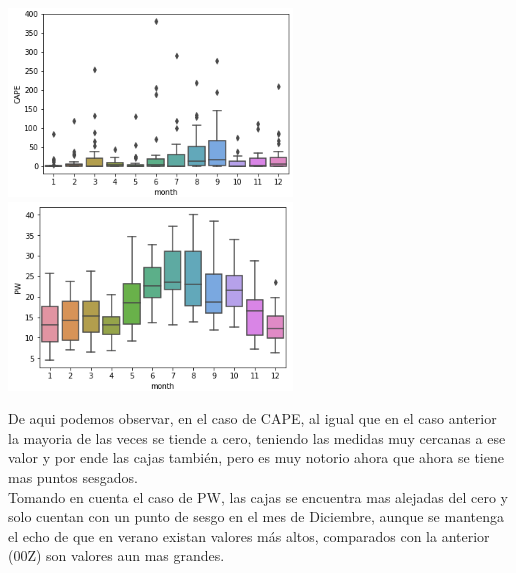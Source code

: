 \documentclass[12pt]{article}
\begin{document}
\begin{center}
	\includegraphics[height=5cm]{02.png} \hspace*{\fill}
    \includegraphics[height=5cm]{022.png}
\end{center}
De aqui podemos observar, en el caso de CAPE, al igual que en el caso anterior la mayoria de las veces se tiende a cero, teniendo las medidas muy cercanas a ese valor y por ende las cajas también, pero es muy notorio ahora que ahora se tiene mas puntos sesgados.\\

Tomando en cuenta el caso de PW, las cajas se encuentra mas alejadas del cero y solo cuentan con un punto de sesgo en el mes de Diciembre, aunque se mantenga el echo de que en verano existan valores más altos, comparados con la anterior (00Z) son valores aun mas grandes.\\
\end{document}
